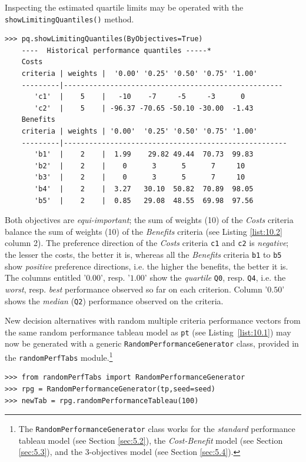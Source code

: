 Inspecting the estimated quartile limits may be operated with the\\ \texttt{showLimitingQuantiles()} method.
\begin{lstlisting}[caption={Printing out the estimated quartile limits},label=list:10.2]
>>> pq.showLimitingQuantiles(ByObjectives=True)
    ----  Historical performance quantiles -----*
    Costs
    criteria | weights |  '0.00' '0.25' '0.50' '0.75' '1.00'   
    ---------|----------------------------------------------------
       'c1'  |    5    |   -10    -7     -5     -3      0  
       'c2'  |    5    | -96.37 -70.65 -50.10 -30.00  -1.43  
    Benefits
    criteria | weights | '0.00'  '0.25' '0.50' '0.75' '1.00'   
    ---------|-----------------------------------------------------
       'b1'  |    2    |  1.99    29.82 49.44  70.73  99.83  
       'b2'  |    2    |    0      3      5      7     10  
       'b3'  |    2    |    0      3      5      7     10  
       'b4'  |    2    |  3.27   30.10  50.82  70.89  98.05  
       'b5'  |    2    |  0.85   29.08  48.55  69.98  97.56  
\end{lstlisting}
Both objectives are \emph{equi-important}; the sum of weights (10) of the \emph{Costs} criteria balance the sum of weights (10) of the \emph{Benefits} criteria (see Listing \ref{list:10.2} column 2). The preference direction of the \emph{Costs} criteria \texttt{c1} and \texttt{c2} is \emph{negative}; the lesser the costs, the better it is, whereas all the \emph{Benefits} criteria \texttt{b1} to \texttt{b5} show \emph{positive} preference directions, i.e. the higher the benefits, the better it is. The columns entitled '$0.00$', resp. '$1.00$' show the \emph{quartile} \texttt{Q0}, resp. \texttt{Q4}, i.e. the \emph{worst}, resp. \emph{best} performance observed so far on each criterion. Column '$0.50$' shows the \emph{median} (\texttt{Q2}) performance observed on the criteria.  

New  decision alternatives with random multiple criteria performance vectors from the same random performance tableau model as \texttt{pt} (see Listing~\ref{list:10.1}) may now be generated with a generic \texttt{RandomPerformanceGenerator} class, provided in the \texttt{randomPerfTabs} module.\footnote{The \texttt{RandomPerformanceGenerator} class works for the \emph{standard} performance tableau model (see Section \ref{sec:5.2}), the \emph{Cost-Benefit} model (see Section \ref{sec:5.3}), and the 3-objectives model (see Section \ref{sec:5.4}).}
\begin{lstlisting}[caption={Generating 100 new random decision alternatives of the same model},label=list:10.3]
>>> from randomPerfTabs import RandomPerformanceGenerator
>>> rpg = RandomPerformanceGenerator(tp,seed=seed)
>>> newTab = rpg.randomPerformanceTableau(100)
\end{lstlisting}

